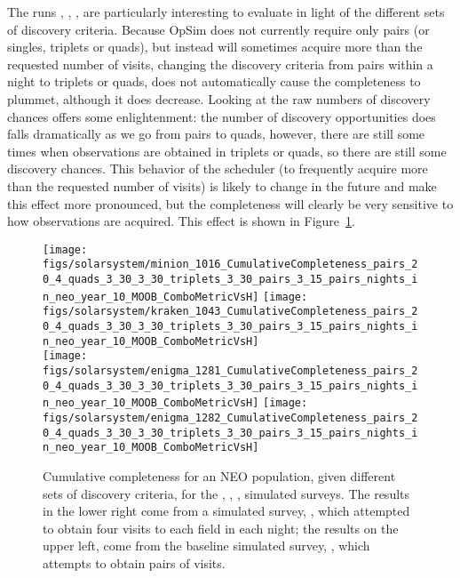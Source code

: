 The runs , ,
, 
are particularly interesting to evaluate in light of the different
sets of discovery criteria. Because OpSim does not currently require
only pairs (or singles, triplets or quads), but instead will sometimes
acquire more than the requested number of visits, changing the
discovery criteria from pairs within a night to triplets or quads,
does not automatically cause the completeness to plummet, although it
does decrease. Looking at the raw numbers of discovery chances offers some
enlightenment: the number of discovery opportunities does falls dramatically as we go from pairs to quads, however, there
are still some times when observations are obtained in triplets or
quads, so there are still some discovery chances. This behavior of the
scheduler (to frequently acquire more than the requested number of
visits) is likely to change in the future and make this effect more pronounced, but the completeness will
clearly be very sensitive to how observations are acquired. This effect is shown in
Figure~\ref{completeness_changes}.

\begin{figure}
\texttt{[image: figs/solarsystem/minion\_1016\_CumulativeCompleteness\_pairs\_20\_4\_quads\_3\_30\_3\_30\_triplets\_3\_30\_pairs\_3\_15\_pairs\_nights\_in\_neo\_year\_10\_MOOB\_ComboMetricVsH]}
\texttt{[image: figs/solarsystem/kraken\_1043\_CumulativeCompleteness\_pairs\_20\_4\_quads\_3\_30\_3\_30\_triplets\_3\_30\_pairs\_3\_15\_pairs\_nights\_in\_neo\_year\_10\_MOOB\_ComboMetricVsH]} \\
\texttt{[image: figs/solarsystem/enigma\_1281\_CumulativeCompleteness\_pairs\_20\_4\_quads\_3\_30\_3\_30\_triplets\_3\_30\_pairs\_3\_15\_pairs\_nights\_in\_neo\_year\_10\_MOOB\_ComboMetricVsH]}
\texttt{[image: figs/solarsystem/enigma\_1282\_CumulativeCompleteness\_pairs\_20\_4\_quads\_3\_30\_3\_30\_triplets\_3\_30\_pairs\_3\_15\_pairs\_nights\_in\_neo\_year\_10\_MOOB\_ComboMetricVsH]}
\caption{Cumulative completeness for an NEO population, given
  different sets of discovery criteria, for the , ,
,
 simulated surveys. The results in the
lower right come from a simulated survey, ,
which attempted to obtain four visits to each field in each
night; the results on the upper left, come from the baseline simulated
survey, , which attempts to obtain pairs of
visits.
\label{completeness_changes}}
\end{figure}

